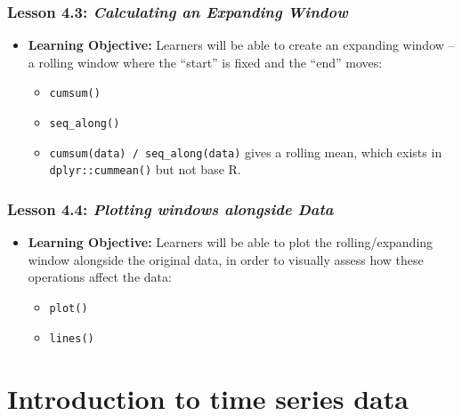 \documentclass[
]{book}
\providecommand{\tightlist}{%
  \setlength{\itemsep}{0pt}\setlength{\parskip}{0pt}}
\begin{document}
\hypertarget{lesson-4.3-calculating-an-expanding-window}{%
\subsection*{\texorpdfstring{Lesson 4.3: \emph{Calculating an Expanding Window}}{Lesson 4.3: Calculating an Expanding Window}}\label{lesson-4.3-calculating-an-expanding-window}}

\begin{itemize}
\tightlist
\item
  \textbf{Learning Objective:} Learners will be able to create an expanding window -- a rolling window where the ``start'' is fixed and the ``end'' moves:

  \begin{itemize}
  \tightlist
  \item
    \texttt{cumsum()}
  \item
    \texttt{seq\_along()}
  \item
    \texttt{cumsum(data)\ /\ seq\_along(data)} gives a rolling mean, which exists in \texttt{dplyr::cummean()} but not base R.
  \end{itemize}
\end{itemize}

\hypertarget{lesson-4.4-plotting-windows-alongside-data}{%
\subsection*{\texorpdfstring{Lesson 4.4: \emph{Plotting windows alongside Data}}{Lesson 4.4: Plotting windows alongside Data}}\label{lesson-4.4-plotting-windows-alongside-data}}

\begin{itemize}
\tightlist
\item
  \textbf{Learning Objective:} Learners will be able to plot the rolling/expanding window alongside the original data, in order to visually assess how these operations affect the data:

  \begin{itemize}
  \tightlist
  \item
    \texttt{plot()}
  \item
    \texttt{lines()}
  \end{itemize}
\end{itemize}

\hypertarget{introduction-to-time-series-data}{%
\chapter{Introduction to time series data}\label{introduction-to-time-series-data}}
\end{document}
